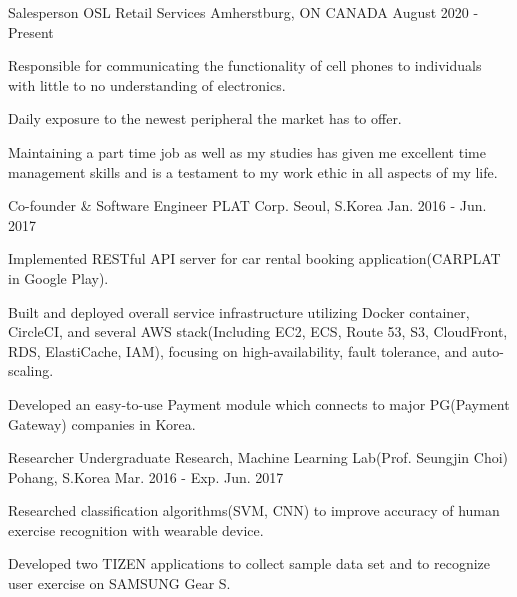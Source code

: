 

\begin{cventries}

  \cventry
    {Salesperson} %
    {OSL Retail Services} %
    {Amherstburg, ON CANADA} %
    {August 2020 - Present} %
    {
      \begin{cvitems} %
        \item {Responsible for communicating the functionality of cell phones to individuals with little to no understanding of electronics.}
        \item {Daily exposure to the newest peripheral the market has to offer.}
        \item {Maintaining a part time job as well as my studies has given me excellent time management skills and is a testament to my work ethic in all aspects of my life.}
      \end{cvitems}
    }

  \cventry
    {Co-founder \& Software Engineer} %
    {PLAT Corp.} %
    {Seoul, S.Korea} %
    {Jan. 2016 - Jun. 2017} %
    {
      \begin{cvitems} %
        \item {Implemented RESTful API server for car rental booking application(CARPLAT in Google Play).}
        \item {Built and deployed overall service infrastructure utilizing Docker container, CircleCI, and several AWS stack(Including EC2, ECS, Route 53, S3, CloudFront, RDS, ElastiCache, IAM), focusing on high-availability, fault tolerance, and auto-scaling.}
        \item {Developed an easy-to-use Payment module which connects to major PG(Payment Gateway) companies in Korea.}
      \end{cvitems}
    }

  \cventry
    {Researcher} %
    {Undergraduate Research, Machine Learning Lab(Prof. Seungjin Choi)} %
    {Pohang, S.Korea} %
    {Mar. 2016 - Exp. Jun. 2017} %
    {
      \begin{cvitems} %
        \item {Researched classification algorithms(SVM, CNN) to improve accuracy of human exercise recognition with wearable device.}
        \item {Developed two TIZEN applications to collect sample data set and to recognize user exercise on SAMSUNG Gear S.}
      \end{cvitems}
    }


\end{cventries}
